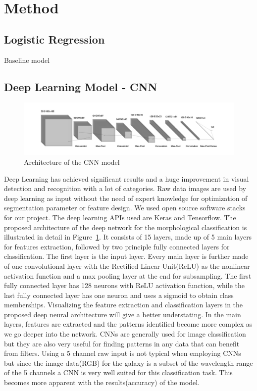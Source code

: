\section{Method}
\label{sec:method}
\subsection{Logistic Regression}
Baseline model

\subsection{Deep Learning Model - CNN}

\begin{figure}[h]
	\centering
	\captionsetup{justification=centering}
	\includegraphics[width=\columnwidth]{Figures/CNNArchitecture.jpg}
	\caption{Architecture of the CNN model}
	\label{fig:cnnarch}
\end{figure}

Deep Learning has achieved significant results and a huge improvement in visual detection and recognition with a lot of categories. Raw data images are used by deep learning as input without the need of expert knowledge for optimization of segmentation parameter or feature design. We used open source software stacks for our project. The deep learning APIs used are Keras and Tensorflow. The proposed architecture of the deep network for the morphological classification is illustrated in detail in Figure~\ref{fig:cnnarch}. It consists of 15 layers, made up of 5 main layers for features extraction, followed by two principle fully connected layers for classification. The first layer is the input layer. Every main layer is further made of one convolutional layer with the Rectified Linear Unit(ReLU) as the nonlinear activation function and a max pooling layer at the end for subsampling. The first fully connected layer has 128 neurons with ReLU activation function, while the last fully connected layer has one neuron and uses a sigmoid to obtain class memberships. Visualizing the feature extraction and classification layers in the proposed deep neural architecture will give a better understating. In the main layers, features are extracted and the patterns identified become more complex as we go deeper into the network. CNNs are generally used for image classification but they are also very useful for finding patterns in any data that can benefit from filters. Using a 5 channel raw input is not typical when employing CNNs but since the image data(RGB) for the galaxy is a subset of the wavelength range of the 5 channels a CNN is very well suited for this classification task. This becomes more apparent with the results(accuracy) of the model.
